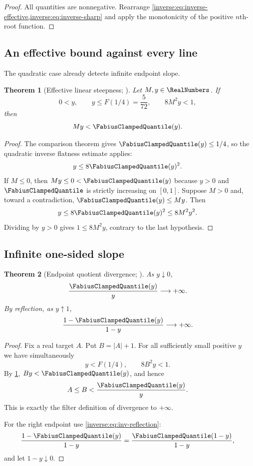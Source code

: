\documentclass[11pt,oneside]{article}
\newtheorem{theorem}{Theorem}[section]
\theoremstyle{definition}
\theoremstyle{remark}
\begin{document}
\begin{proof}
All quantities are nonnegative.  Rearrange
\cref{inverse:eq:inverse-effective,inverse:eq:inverse-sharp} and apply the monotonicity of
the positive $n$th-root function.
\end{proof}

\subsection{An effective bound against every line}

The quadratic case already detects infinite endpoint slope.

\begin{theorem}[Effective linear steepness; \Formalized]
\label{inverse:thm:effective-linear}
Let $M,y\in\RealNumbers$.  If
\[
 0<y,\qquad y\leq F(1/4)=\frac5{72},\qquad
 8M^2y<1,
\]
then
\[
 My<\FabiusClampedQuantile(y).
\]
\end{theorem}

\begin{proof}
The comparison theorem gives $\FabiusClampedQuantile(y)\leq1/4$, so the quadratic inverse
flatness estimate applies:
\[
 y\leq8\FabiusClampedQuantile(y)^2. \label{inverse:eq:quadratic-inv}
\]
If $M\leq0$, then $My\leq0<\FabiusClampedQuantile(y)$ because $y>0$ and $\FabiusClampedQuantile$ is strictly
increasing on $[0,1]$.  Suppose $M>0$ and, toward a contradiction,
$\FabiusClampedQuantile(y)\leq My$.  Then
\[
 y\leq8\FabiusClampedQuantile(y)^2\leq8M^2y^2.
\]
Dividing by $y>0$ gives $1\leq8M^2y$, contrary to the last hypothesis.
\end{proof}

\subsection{Infinite one-sided slope}

\begin{theorem}[Endpoint quotient divergence; \Formalized]
\label{inverse:thm:inverse-quotient}
As $y\downarrow0$,
\[
 \frac{\FabiusClampedQuantile(y)}{y}\longrightarrow+\infty.
\]
By reflection, as $y\uparrow1$,
\[
 \frac{1-\FabiusClampedQuantile(y)}{1-y}\longrightarrow+\infty.
\]
\end{theorem}

\begin{proof}
Fix a real target $A$.  Put $B=|A|+1$.  For all sufficiently small
positive $y$ we have simultaneously
\[
 y<F(1/4),\qquad 8B^2y<1.
\]
By \cref{inverse:thm:effective-linear}, $By<\FabiusClampedQuantile(y)$, and hence
\[
 A\leq B<\frac{\FabiusClampedQuantile(y)}y.
\]
This is exactly the filter definition of divergence to $+\infty$.

For the right endpoint use \eqref{inverse:eq:inv-reflection}:
\[
 \frac{1-\FabiusClampedQuantile(y)}{1-y}
 =\frac{\FabiusClampedQuantile(1-y)}{1-y},
\]
and let $1-y\downarrow0$.
\end{proof}
\end{document}
